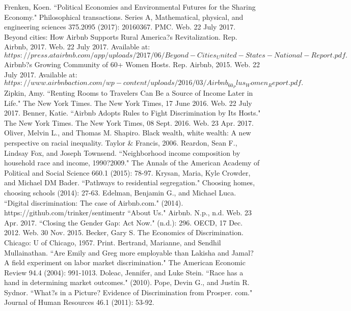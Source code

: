 \documentclass[11pt, oneside]{article}
\begin{document}
\begin{thebibliography}{16} 
Frenken, Koen. ``Political Economies and Environmental Futures for the Sharing Economy." Philosophical transactions. Series A, Mathematical, physical, and engineering sciences 375.2095 (2017): 20160367. PMC. Web. 22 July 2017.
Beyond cities: How Airbnb Supports Rural America?s Revitalization. Rep. Airbnb, 2017. Web. 22 July 2017. Available at: $https://press.atairbnb.com/app/uploads/2017/06/Beyond-Cities_United-States-National-Report.pdf.$ 
Airbnb?s Growing Community of 60+ Women Hosts. Rep. Airbnb, 2015. Web. 22 July 2017. Available at: $https://www.airbnbaction.com/wp-content/uploads/2016/03/Airbnb_60_Plus_Women_Report.pdf.$ 
Zipkin, Amy. ``Renting Rooms to Travelers Can Be a Source of Income Later in Life." The New York Times. The New York Times, 17 June 2016. Web. 22 July 2017.
Benner, Katie. ``Airbnb Adopts Rules to Fight Discrimination by Its Hosts." The New York Times. The New York Times, 08 Sept. 2016. Web. 23 Apr. 2017.
Oliver, Melvin L., and Thomas M. Shapiro. Black wealth, white wealth: A new perspective on racial inequality. Taylor \& Francis, 2006.
Reardon, Sean F., Lindsay Fox, and Joseph Townsend. ``Neighborhood income composition by household race and income, 1990?2009." The Annals of the American Academy of Political and Social Science 660.1 (2015): 78-97.
Krysan, Maria, Kyle Crowder, and Michael DM Bader. ``Pathways to residential segregation." Choosing homes, choosing schools (2014): 27-63.
Edelman, Benjamin G., and Michael Luca. ``Digital discrimination: The case of Airbnb.com." (2014).
https://github.com/trinker/sentimentr
``About Us." Airbnb. N.p., n.d. Web. 23 Apr. 2017.
``Closing the Gender Gap: Act Now." (n.d.): 296. OECD, 17 Dec. 2012. Web. 30 Nov. 2015.
Becker, Gary S. The Economics of Discrimination. Chicago: U of Chicago, 1957. Print.
Bertrand, Marianne, and Sendhil Mullainathan. ``Are Emily and Greg more employable than Lakisha and Jamal? A field experiment on labor market discrimination." The American Economic Review 94.4 (2004): 991-1013.
Doleac, Jennifer, and Luke Stein. ``Race has a hand in determining market outcomes." (2010).
Pope, Devin G., and Justin R. Sydnor. ``What?s in a Picture? Evidence of Discrimination from Prosper. com." Journal of Human Resources 46.1 (2011): 53-92.

\end{thebibliography}
\end{document}
